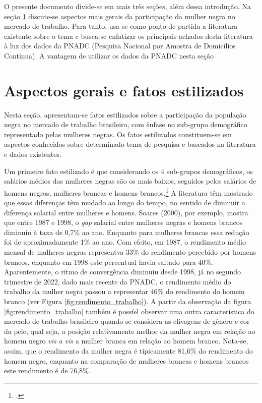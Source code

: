 \documentclass[12pt]{article}
\begin{document}
\par O presente documento divide-se em mais três seções, além dessa introdução. Na seção \ref{overview} discute-se aspectos mais gerais da participação da mulher negra no mercado de trabalho. Para tanto, usa-se como ponto de partida a literatura existente sobre o tema e busca-se enfatizar os principais achados desta literatura à luz dos dados da PNADC (Pesquisa Nacional por Amostra de Domicílios Contínua). A vantagem de utilizar os dados da PNADC nesta seção 

\section{Aspectos gerais e fatos estilizados} \label{overview}

\par Nesta seção, apresentam-se fatos estilizados sobre a participação da população negra no mercado de trabalho brasileiro, com ênfase no sub-grupo demográfico representado pelas mulheres negras. Os fatos estilizados constituem-se em aspectos conhecidos sobre determinado tema de pesquisa e baseados na literatura e dados existentes.

\par Um primeiro fato estilizado é que considerando os 4 sub-grupos demográficos, os salários médios das mulheres negras são os mais baixos, seguidos pelos salários de homens negros, mulheres brancas e homens brancos.\footcite{soares2000perfil,campante2004desigualdade} A literatura têm mostrado que essas diferenças têm mudado ao longo do tempo, no sentido de diminuir a diferença salarial entre mulheres e homens. Soares (2000), por exemplo, mostra que entre 1987 e 1998, o \textit{gap} salarial entre mulheres negras e homens brancos diminuiu à taxa de 0,7\% ao ano. Enquanto para mulheres brancas essa redução foi de aproximadamente 1\% ao ano. Com efeito, em 1987, o rendimento médio mensal de mulheres negras representva 33\% do rendimento percebido por homens brancos, enquanto em 1998 este percentual havia saltado para 40\%. Aparentemente, o ritmo de convergência diminuiu desde 1998, já no segundo trimestre de 2022, dado mais recente da PNADC, o rendimento médio do trabalho da mulher negra passou a representar 46\% do rendimento do homem branco (ver Figura \ref{fig:rendimento_trabalho}). A partir da observação da figura \ref{fig:rendimento_trabalho} também é possíel observar uma outra característica do mercado de trabalho brasileiro quando se considera as clivagens de gênero e cor da pele, qual seja, a posição relativamente melhor da mulher negra em relação ao homem negro \textit{vis a vis} a mulher branca em relação ao homem branco. Nota-se, assim, que o rendimento da mulher negra é tipicamente 81,6\% do rendimento do homem negro, enquanto na comparação de mulheres brancas e homens brancos este rendimento é de 76,8\%.
\end{document}
